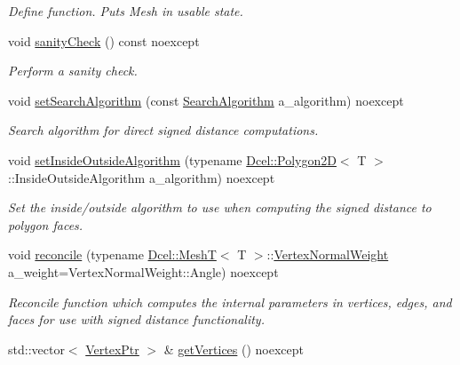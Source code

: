 \begin{DoxyCompactItemize}
\begin{DoxyCompactList}\small\item\em Define function. Puts Mesh in usable state. \end{DoxyCompactList}\item 
void \hyperlink{classDcel_1_1MeshT_a1814ba63c6e0d7a007ee78c24d6ea159}{sanity\+Check} () const noexcept
\begin{DoxyCompactList}\small\item\em Perform a sanity check. \end{DoxyCompactList}\item 
void \hyperlink{classDcel_1_1MeshT_abc7a2bd7632be06c0ad9cf49816d262f}{set\+Search\+Algorithm} (const \hyperlink{classDcel_1_1MeshT_abb4c3bb7a52804bb041c133f30151399}{Search\+Algorithm} a\+\_\+algorithm) noexcept
\begin{DoxyCompactList}\small\item\em Search algorithm for direct signed distance computations. \end{DoxyCompactList}\item 
void \hyperlink{classDcel_1_1MeshT_a1e46a744a2526e451229e2f2e4830ca5}{set\+Inside\+Outside\+Algorithm} (typename \hyperlink{classDcel_1_1Polygon2D}{Dcel\+::\+Polygon2D}$<$ T $>$\+::Inside\+Outside\+Algorithm a\+\_\+algorithm) noexcept
\begin{DoxyCompactList}\small\item\em Set the inside/outside algorithm to use when computing the signed distance to polygon faces. \end{DoxyCompactList}\item 
void \hyperlink{classDcel_1_1MeshT_a98d80b5f83b9d6ff55d0d0da34d0b422}{reconcile} (typename \hyperlink{classDcel_1_1MeshT}{Dcel\+::\+MeshT}$<$ T $>$\+::\hyperlink{classDcel_1_1MeshT_a0cd3a02853cf4fcc34a0816368ed4dc0}{Vertex\+Normal\+Weight} a\+\_\+weight=Vertex\+Normal\+Weight\+::\+Angle) noexcept
\begin{DoxyCompactList}\small\item\em Reconcile function which computes the internal parameters in vertices, edges, and faces for use with signed distance functionality. \end{DoxyCompactList}\item 
\mbox{\label{classDcel_1_1MeshT_a0ccf0a5a707dbad79b3578a401449e9c}} 
std\+::vector$<$ \hyperlink{classDcel_1_1MeshT_a1e0abeadcb51e679b0dd9a36e2ee08c7}{Vertex\+Ptr} $>$ \& \hyperlink{classDcel_1_1MeshT_a0ccf0a5a707dbad79b3578a401449e9c}{get\+Vertices} () noexcept

\end{DoxyCompactItemize}
